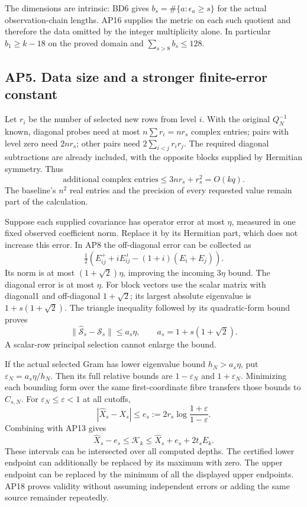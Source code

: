 \documentclass[11pt]{article}
\begin{document}
The dimensions are intrinsic: BD6 gives \(b_s=\#\{a:\epsilon_a\ge s\}\) for the actual observation-chain lengths. AP16 supplies the metric on each such quotient and therefore the data omitted by the integer multiplicity alone. In particular \(b_1\ge k-18\) on the proved domain and \(\sum_{s>8}b_s\le128\).

\subsection{AP5. Data size and a stronger finite-error constant}\label{ap5.-data-size-and-a-stronger-finite-error-constant}

Let \(r_i\) be the number of selected new rows from level \(i\). With the original \(Q_N^{-1}\) known, diagonal probes need at most \(n\sum r_i=nr_s\) complex entries; pairs with level zero need \(2nr_s\); other pairs need \(2\sum_{i<j}r_ir_j\). The required diagonal subtractions are already included, with the opposite blocks supplied by Hermitian symmetry. Thus \[
 \text{additional complex entries}\le3nr_s+r_s^2=O(kq). \tag{AP19}
\] The baseline's \(n^2\) real entries and the precision of every requested value remain part of the calculation.

Suppose each supplied covariance has operator error at most \(\eta\), measured in one fixed observed coefficient norm. Replace it by its Hermitian part, which does not increase this error. In AP8 the off-diagonal error can be collected as \[
 \tfrac12\left(E_{ij}^{+}+iE_{ij}^{\,i}-(1+i)(E_i+E_j)\right).
\] Its norm is at most \((1+\sqrt2)\eta\), improving the incoming \(3\eta\) bound. The diagonal error is at most \(\eta\). For block vectors use the scalar matrix with diagonal1 and off-diagonal \(1+\sqrt2\); its largest absolute eigenvalue is \(1+s(1+\sqrt2)\). The triangle inequality followed by its quadratic-form bound proves \[
 \|\widehat{\mathcal S}_s-\mathcal S_s\|
 \le a_s\eta,\qquad a_s=1+s(1+\sqrt2). \tag{AP20}
\] A scalar-row principal selection cannot enlarge the bound.

If the actual selected Gram has lower eigenvalue bound \(h_N> a_s\eta\), put \(\varepsilon_N=a_s\eta/h_N\). Then its full relative bounds are \(1-\varepsilon_N\) and \(1+\varepsilon_N\). Minimizing each bounding form over the same first-coordinate fibre transfers those bounds to \(C_{s,N}\). For \(\varepsilon_N\le\varepsilon<1\) at all cutoffs, \[
 |\widehat X_s-X_s|\le
 e_s:=2r_s\log\frac{1+\varepsilon}{1-\varepsilon}. \tag{AP21}
\] Combining with AP13 gives \[
 \widehat X_s-e_s\le\mathcal K_k
 \le\widehat X_s+e_s+2t_sE_k. \tag{AP22}
\] These intervals can be intersected over all computed depths. The certified lower endpoint can additionally be replaced by its maximum with zero. The upper endpoint can be replaced by the minimum of all the displayed upper endpoints. AP18 proves validity without assuming independent errors or adding the same source remainder repeatedly.
\end{document}
